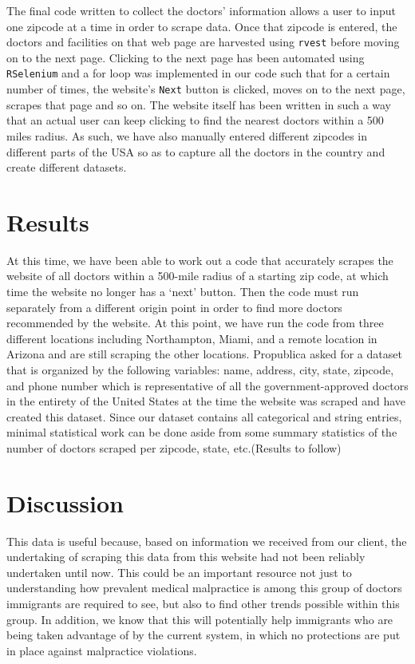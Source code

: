 \documentclass[10pt,letterpaper]{article}
\begin{document}
The final code written to collect the doctors' information allows a user
to input one zipcode at a time in order to scrape data. Once that
zipcode is entered, the doctors and facilities on that web page are
harvested using \texttt{rvest} before moving on to the next page.
Clicking to the next page has been automated using \texttt{RSelenium}
and a for loop was implemented in our code such that for a certain
number of times, the website's \texttt{Next} button is clicked, moves on
to the next page, scrapes that page and so on. The website itself has
been written in such a way that an actual user can keep clicking to find
the nearest doctors within a 500 miles radius. As such, we have also
manually entered different zipcodes in different parts of the USA so as
to capture all the doctors in the country and create different datasets.

\section{Results}\label{results}

At this time, we have been able to work out a code that accurately
scrapes the website of all doctors within a 500-mile radius of a
starting zip code, at which time the website no longer has a `next'
button. Then the code must run separately from a different origin point
in order to find more doctors recommended by the website. At this point,
we have run the code from three different locations including
Northampton, Miami, and a remote location in Arizona and are still
scraping the other locations. Propublica asked for a dataset that is
organized by the following variables: name, address, city, state,
zipcode, and phone number which is representative of all the
government-approved doctors in the entirety of the United States at the
time the website was scraped and have created this dataset. Since our
dataset contains all categorical and string entries, minimal statistical
work can be done aside from some summary statistics of the number of
doctors scraped per zipcode, state, etc.(Results to follow)

\section{Discussion}\label{discussion}

This data is useful because, based on information we received from our
client, the undertaking of scraping this data from this website had not
been reliably undertaken until now. This could be an important resource
not just to understanding how prevalent medical malpractice is among
this group of doctors immigrants are required to see, but also to find
other trends possible within this group. In addition, we know that this
will potentially help immigrants who are being taken advantage of by the
current system, in which no protections are put in place against
malpractice violations.
\end{document}
